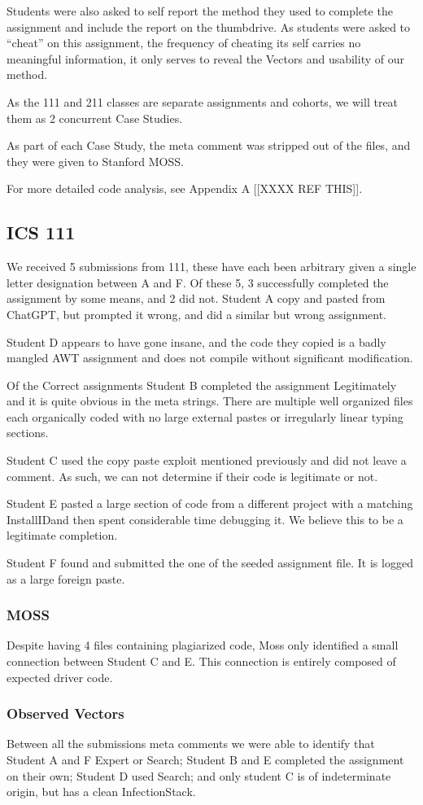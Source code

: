 \documentclass[conference]{IEEEtran}
\newcommand{\n}{\hfill\break}
\newcommand{\installID}{InstallID}
\newcommand{\infectionStack}{InfectionStack}
\begin{document}
Students were also asked to self report the method they used to complete the assignment and include the report on the thumbdrive.  As students were asked to ``cheat'' on this assignment, the frequency of cheating its self carries no meaningful information, it only serves to reveal the Vectors and usability of our method.

As the 111 and 211 classes are separate assignments and cohorts, we will treat them as 2 concurrent Case Studies. 

As part of each Case Study, the meta comment was stripped out of the files, and they were given to Stanford MOSS.

For more detailed code analysis, see Appendix A [[XXXX REF THIS]].
\subsection{\textbf{ICS 111}}
We received 5 submissions from 111, these have each been arbitrary given a single letter designation between A and F.  Of these 5, 3 successfully completed the assignment by some means, and 2 did not.  Student A copy and pasted from ChatGPT, but prompted it wrong, and did a similar but wrong assignment.  

Student D appears to have gone insane, and the code they copied is a badly mangled AWT assignment and does not compile without significant modification.

Of the Correct assignments Student B completed the assignment Legitimately and it is quite obvious in the meta strings.  There are multiple well organized files each organically coded with no large external pastes or irregularly linear typing sections.

Student C used the copy paste exploit mentioned previously and did not leave a comment.  As such, we can not determine if their code is legitimate or not.

Student E pasted a large section of code from a different project with a matching \installID and then spent considerable time debugging it.  We believe this to be a legitimate completion.

Student F found and submitted the one of the seeded assignment file.  It is logged as a large foreign paste.

\n\subsubsection*{\textbf{MOSS}}\hfill\break\indent
Despite having 4 files containing plagiarized code, Moss only identified a small connection between Student C and E.  This connection is entirely composed of expected driver code. 
\n\subsubsection*{\textbf{Observed Vectors}}\hfill\break\indent
Between all the submissions meta comments we were able to identify that Student A and F Expert or Search; Student B and E completed the assignment on their own; Student D used Search; and only student C is of indeterminate origin, but has a clean \infectionStack.
\end{document}
